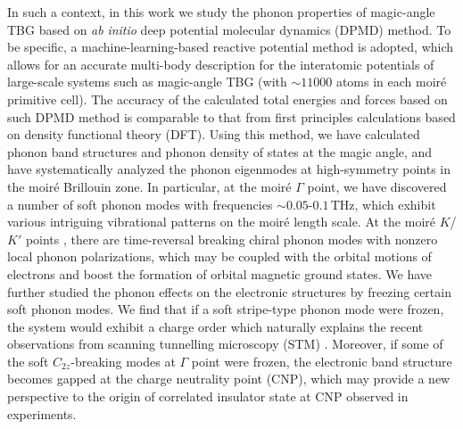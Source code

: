 \documentclass[aps,prl,twocolumn,amsmath,amssymb]{revtex4-2}
\begin{document}
In such a context, in this work we  study the phonon properties of magic-angle TBG based on \textit{ab} \textit{initio} deep potential molecular dynamics (DPMD) method.
To be specific, a machine-learning-based reactive potential method \cite{wangh-dpkit-comphy18,zhanglf-dpgen-comphy20} is adopted, 
which allows for an accurate multi-body  description for the interatomic potentials of large-scale systems such as magic-angle TBG (with $\sim 11000$ atoms in each moir\'e primitive cell). The accuracy of the calculated total energies and forces based on such DPMD method is comparable to that from first principles calculations based on density functional theory (DFT).
Using this method, we have calculated phonon band structures and phonon density of states at the magic angle, and have systematically analyzed the phonon eigenmodes at high-symmetry points in the moir\'e Brillouin zone. In particular, at the moir\'e $\Gamma$ point, we have discovered a number of soft phonon modes with frequencies $\sim 0.05\textrm{-}0.1\,$THz, which exhibit various intriguing vibrational patterns on the moir\'e length scale. %
At the moir\'e $K$/$K'$ points , there are  time-reversal breaking chiral phonon modes with nonzero local phonon polarizations, which may be coupled with the orbital motions of electrons and boost the formation of orbital magnetic ground states. We have further studied the phonon effects on the electronic structures by freezing certain soft phonon modes. We find that if a soft stripe-type phonon mode were frozen,  the system would exhibit a charge order which naturally explains the recent observations from scanning tunnelling microscopy (STM) \cite{tbg-stm-andrei19}. Moreover,  if some of the soft $C_{2z}$-breaking modes at $\Gamma$ point were frozen, the electronic band structure becomes gapped at the charge neutrality point (CNP), which may provide a new perspective to the origin of correlated insulator state at CNP observed in experiments.
\end{document}
